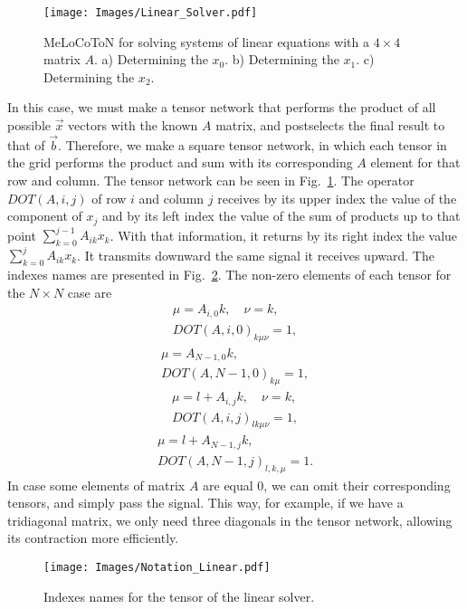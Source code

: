 \begin{figure}[h]
    \centering
    \texttt{[image: Images/Linear\_Solver.pdf]}
    \caption{MeLoCoToN for solving systems of linear equations with a $4\times 4$ matrix $A$. a) Determining the $x_0$. b) Determining the $x_1$. c) Determining the $x_2$.}
    \label{fig: Lineal Solver}
\end{figure}

In this case, we must make a tensor network that performs the product of all possible $\vec{x}$ vectors with the known $A$ matrix, and postselects the final result to that of $\vec{b}$. Therefore, we make a square tensor network, in which each tensor in the grid performs the product and sum with its corresponding $A$ element for that row and column. The tensor network can be seen in Fig.~\ref{fig: Lineal Solver}. The operator $DOT(A,i,j)$ of row $i$ and column $j$ receives by its upper index the value of the component of $x_j$ and by its left index the value of the sum of products up to that point $\sum_{k=0}^{j-1}A_{ik}x_k$. With that information, it returns by its right index the value $\sum_{k=0}^{j}A_{ik}x_k$. It transmits downward the same signal it receives upward. The indexes names are presented in Fig.~\ref{fig: Notation_Linear}. The non-zero elements of each tensor for the $N\times N$ case are
\begin{equation}
    \begin{gathered}
        \mu = A_{i,0} k,\quad \nu=k,\\
        DOT(A,i,0)_{k\mu\nu} = 1,
    \end{gathered}
\end{equation}
\begin{equation}
    \begin{gathered}
        \mu = A_{N-1,0} k,\\
        DOT(A,N-1,0)_{k\mu} = 1,
    \end{gathered}
\end{equation}
\begin{equation}
    \begin{gathered}
        \mu = l+A_{i,j} k,\quad \nu=k,\\
        DOT(A,i,j)_{lk\mu\nu} = 1,
    \end{gathered}
\end{equation}
\begin{equation}
    \begin{gathered}
        \mu = l+A_{N-1,j} k,\\
        DOT(A,N-1,j)_{l,k,\mu} = 1.
    \end{gathered}
\end{equation}
In case some elements of matrix $A$ are equal 0, we can omit their corresponding tensors, and simply pass the signal. This way, for example, if we have a tridiagonal matrix, we only need three diagonals in the tensor network, allowing its contraction more efficiently.
\begin{figure}[h]
    \centering
    \texttt{[image: Images/Notation\_Linear.pdf]}
    \caption{Indexes names for the tensor of the linear solver.}
    \label{fig: Notation_Linear}
\end{figure}



